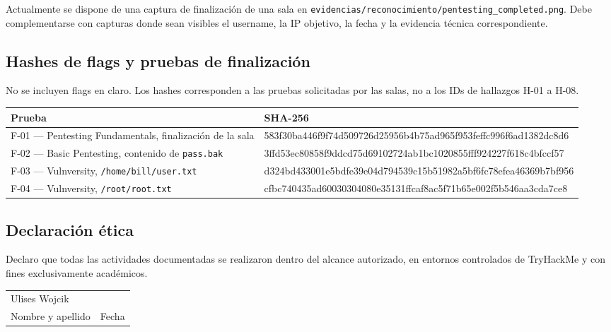 \documentclass[11pt,a4paper]{article}
\begin{document}
Actualmente se dispone de una captura de finalización de una sala en \texttt{evidencias/reconocimiento/pentesting\_completed.png}. Debe complementarse con capturas donde sean visibles el username, la IP objetivo, la fecha y la evidencia técnica correspondiente.

\subsection{Hashes de flags y pruebas de finalización}
No se incluyen flags en claro. Los hashes corresponden a las pruebas solicitadas por las salas, no a los IDs de hallazgos H-01 a H-08.

\begin{center}
\begin{tabularx}{0.9\textwidth}{@{}p{3cm}X@{}}
\toprule
\textbf{Prueba} & \textbf{SHA-256}\\
\midrule
F-01 --- Pentesting Fundamentals, finalización de la sala & 583f30ba446f9f74d509726d25956b4b75ad965f953feffc996f6ad1382dc8d6\\
F-02 --- Basic Pentesting, contenido de \texttt{pass.bak} & 3ffd53ec80858f9ddcd75d69102724ab1bc1020855fff924227f618c4bfccf57\\
F-03 --- Vulnversity, \texttt{/home/bill/user.txt} & d324bd433001e5bdfe39e04d794539c15b51982a5bf6fc78efea46369b7bf956\\
F-04 --- Vulnversity, \texttt{/root/root.txt} & cfbc740435ad60030304080e35131ffcaf8ac5f71b65e002f5b546aa3cda7ce8\\
\bottomrule
\end{tabularx}
\end{center}

\subsection{Declaración ética}
Declaro que todas las actividades documentadas se realizaron dentro del alcance autorizado, en entornos controlados de TryHackMe y con fines exclusivamente académicos.

\vspace{1cm}
\begin{tabularx}{\textwidth}{@{}X X@{}}
Ulises Wojcik & \dotfill\\
Nombre y apellido & Fecha\\
\end{tabularx}
\end{document}
